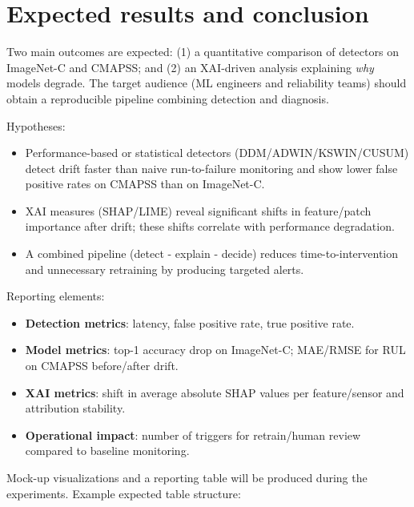 
\section{Expected results and conclusion}
\label{sec:expected_results}

Two main outcomes are expected: (1) a quantitative comparison of detectors on ImageNet-C and CMAPSS; and (2) an XAI-driven analysis explaining \textit{why} models degrade. The target audience (ML engineers and reliability teams) should obtain a reproducible pipeline combining detection and diagnosis.

Hypotheses:
\begin{itemize}
  \item Performance-based or statistical detectors (DDM/ADWIN/KSWIN/CUSUM) detect drift faster than naive run-to-failure monitoring and show lower false positive rates on CMAPSS than on ImageNet-C.
  \item XAI measures (SHAP/LIME) reveal significant shifts in feature/patch importance after drift; these shifts correlate with performance degradation.
  \item A combined pipeline (detect - explain - decide) reduces time-to-intervention and unnecessary retraining by producing targeted alerts.
\end{itemize}

Reporting elements:
\begin{itemize}
  \item \textbf{Detection metrics}: latency, false positive rate, true positive rate.
  \item \textbf{Model metrics}: top-1 accuracy drop on ImageNet-C; MAE/RMSE for RUL on CMAPSS before/after drift.
  \item \textbf{XAI metrics}: shift in average absolute SHAP values per feature/sensor and attribution stability.
  \item \textbf{Operational impact}: number of triggers for retrain/human review compared to baseline monitoring.
\end{itemize}

Mock-up visualizations and a reporting table will be produced during the experiments. Example expected table structure:

